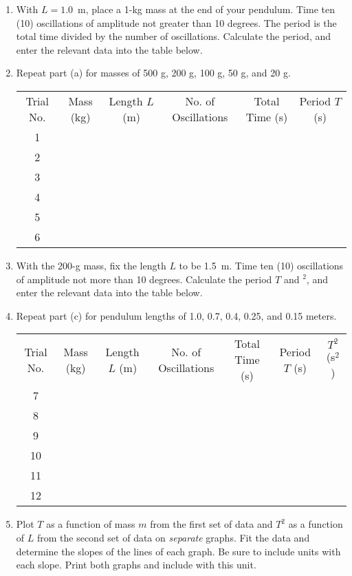 \begin{enumerate}[labparts]

\item With $L = 1.0$~m, place a 1-kg mass at the end of your pendulum. Time ten (10) oscillations of amplitude not greater than 10 degrees. The period is the total time divided by the number of oscillations. Calculate the period, and enter the relevant data into the table below.

\item Repeat part (a) for masses of 500 g, 200 g, 100 g, 50 g, and 20 g.

\begin{center}
\renewcommand{\arraystretch}{1.1}{
\begin{tabular}{|c|c|c|c|c|c|} \hline 
Trial No. & Mass (kg) & Length $L$ (m) & No. of Oscillations& Total Time (s) & Period $T$ (s) \\ 
\hhline{|=|=|=|=|=|=|}
1 & & & & & \\ \hline 
2 & & & & & \\ \hline 
3 & & & & & \\ \hline 
4 & & & & & \\ \hline 
5 & & & & & \\ \hline
 6 & & & & & \\ \hline 
\end{tabular} }
\end{center}

\item With the 200-g mass, fix the length $L$ to be 1.5~m. Time ten (10) oscillations of amplitude not more than 10 degrees. Calculate the period $T$ and $^2$, and enter the relevant data into the table below.

\item Repeat part (c) for pendulum lengths of 1.0, 0.7, 0.4, 0.25, and 0.15 meters.

\begin{center}
\renewcommand{\arraystretch}{1.1}{
\begin{tabular}{|c|c|c|c|c|c|c|} \hline
Trial No. & Mass (kg) & Length $L$ (m) & No. of Oscillations& Total Time (s) & Period $T$ (s) & $T^2$ (s$^2$)\\ 
\hhline{|=|=|=|=|=|=|=|}
7 & & & & & & \\ \hline 
8 & & & & & & \\ \hline 
9 & & & & & & \\ \hline 
10 & & & & & & \\ \hline 
11 & & & & & & \\ \hline
12 &  & & & & & \\ \hline 
\end{tabular} }
\end{center}

\item Plot $T$ as a function of mass $m$ from the first set of data and $T^2$ as a function of $L$ from the second set of data on \textit{separate} graphs. Fit the data and determine the slopes of the lines of each graph. Be sure to include units with each slope. Print both graphs and include with this unit.

\end{enumerate}

